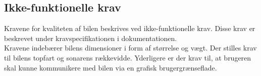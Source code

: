 \subsection{Ikke-funktionelle krav}
Kravene for kvaliteten af bilen beskrives ved ikke-funktionelle krav. Disse krav er beskrevet under kravspecifikationen i dokumentationen. 
\\Kravene indebærer bilens dimensioner i form af størrelse og vægt. Der stilles krav til bilens topfart og sonarens rækkevidde. 
Yderligere er der krav til, at brugeren skal kunne kommunikere med bilen via en grafisk brugergrænseflade.   


